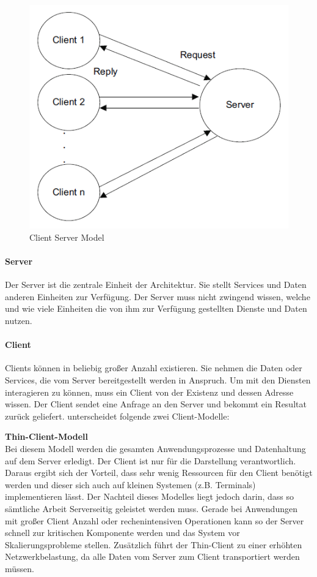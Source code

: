 	\begin{figure}[h]
		\centering
		\includegraphics[width=0.5\linewidth]{images/Clients-und-Server}
		\caption{Client Server Model}
		\label{fig:client-server}
	\end{figure}
	
	\paragraph{Server}
	Der Server ist die zentrale Einheit der Architektur. Sie stellt Services und Daten anderen Einheiten zur Verfügung. Der Server muss nicht zwingend wissen, welche und wie viele Einheiten die von ihm zur Verfügung gestellten Dienste und Daten nutzen.
	
	\paragraph{Client}
	Clients können in beliebig großer Anzahl existieren. Sie nehmen die Daten oder Services, die vom Server bereitgestellt werden in Anspruch. Um mit den Diensten interagieren zu können, muss ein Client von der Existenz und dessen Adresse wissen. Der Client sendet eine Anfrage an den Server und bekommt ein Resultat zurück geliefert. \citet*[S. 302]{Sommerville.2007} unterscheidet folgende zwei Client-Modelle:
		
	\textbf{Thin-Client-Modell}\\
	Bei diesem Modell werden die gesamten Anwendungsprozesse und Datenhaltung auf dem Server erledigt. Der Client ist nur für die Darstellung verantwortlich. Daraus ergibt sich der Vorteil, dass sehr wenig Ressourcen für den Client benötigt werden und dieser sich auch auf kleinen Systemen (z.B. Terminals) implementieren lässt. Der Nachteil dieses Modelles liegt jedoch darin, dass so sämtliche Arbeit Serverseitig geleistet werden muss. Gerade bei Anwendungen mit großer Client Anzahl oder rechenintensiven Operationen kann so der Server schnell zur kritischen Komponente werden und das System vor Skalierungsprobleme stellen. Zusätzlich führt der Thin-Client zu einer erhöhten Netzwerkbelastung, da alle Daten vom Server zum Client transportiert werden müssen.
	
